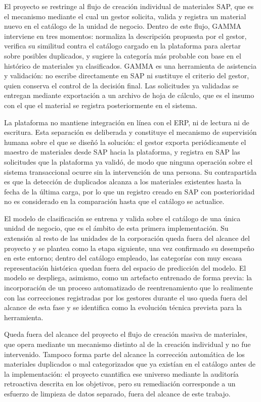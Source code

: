 El proyecto se restringe al flujo de creación individual de materiales SAP, que es el mecanismo mediante el cual un gestor solicita, valida y registra un material nuevo en el catálogo de la unidad de negocio. Dentro de este flujo, GAMMA interviene en tres momentos: normaliza la descripción propuesta por el gestor, verifica su similitud contra el catálogo cargado en la plataforma para alertar sobre posibles duplicados, y sugiere la categoría más probable con base en el histórico de materiales ya clasificados. GAMMA es una herramienta de asistencia y validación: no escribe directamente en SAP ni sustituye el criterio del gestor, quien conserva el control de la decisión final. Las solicitudes ya validadas se entregan mediante exportación a un archivo de hoja de cálculo, que es el insumo con el que el material se registra posteriormente en el sistema.

La plataforma no mantiene integración en línea con el ERP, ni de lectura ni de escritura. Esta separación es deliberada y constituye el mecanismo de supervisión humana sobre el que se diseñó la solución: el gestor exporta periódicamente el maestro de materiales desde SAP hacia la plataforma, y registra en SAP las solicitudes que la plataforma ya validó, de modo que ninguna operación sobre el sistema transaccional ocurre sin la intervención de una persona. Su contrapartida es que la detección de duplicados alcanza a los materiales existentes hasta la fecha de la última carga, por lo que un registro creado en SAP con posterioridad no es considerado en la comparación hasta que el catálogo se actualice.

El modelo de clasificación se entrena y valida sobre el catálogo de una única unidad de negocio, que es el ámbito de esta primera implementación. Su extensión al resto de las unidades de la corporación queda fuera del alcance del proyecto y se plantea como la etapa siguiente, una vez confirmado su desempeño en este entorno; dentro del catálogo empleado, las categorías con muy escasa representación histórica quedan fuera del espacio de predicción del modelo. El modelo se despliega, asimismo, como un artefacto entrenado de forma previa: la incorporación de un proceso automatizado de reentrenamiento que lo realimente con las correcciones registradas por los gestores durante el uso queda fuera del alcance de esta fase y se identifica como la evolución técnica prevista para la herramienta.

Queda fuera del alcance del proyecto el flujo de creación masiva de materiales, que opera mediante un mecanismo distinto al de la creación individual y no fue intervenido. Tampoco forma parte del alcance la corrección automática de los materiales duplicados o mal categorizados que ya existían en el catálogo antes de la implementación: el proyecto cuantifica ese universo mediante la auditoría retroactiva descrita en los objetivos, pero su remediación corresponde a un esfuerzo de limpieza de datos separado, fuera del alcance de este trabajo.

